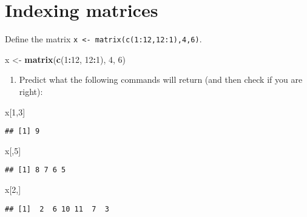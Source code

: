 \documentclass[]{article}
\newenvironment{Shaded}{\begin{snugshade}}{\end{snugshade}}
\newcommand{\KeywordTok}[1]{\textcolor[rgb]{0.13,0.29,0.53}{\textbf{#1}}}
\newcommand{\DecValTok}[1]{\textcolor[rgb]{0.00,0.00,0.81}{#1}}
\newcommand{\StringTok}[1]{\textcolor[rgb]{0.31,0.60,0.02}{#1}}
\newcommand{\OperatorTok}[1]{\textcolor[rgb]{0.81,0.36,0.00}{\textbf{#1}}}
\newcommand{\NormalTok}[1]{#1}
\providecommand{\tightlist}{%
  \setlength{\itemsep}{0pt}\setlength{\parskip}{0pt}}
\begin{document}
\section{Indexing matrices}\label{indexing-matrices}

Define the matrix \texttt{x\ \textless{}-\ matrix(c(1:12,12:1),4,6)}.

\begin{Shaded}
\begin{Highlighting}[]
\NormalTok{x <-}\StringTok{ }\KeywordTok{matrix}\NormalTok{(}\KeywordTok{c}\NormalTok{(}\DecValTok{1}\OperatorTok{:}\DecValTok{12}\NormalTok{, }\DecValTok{12}\OperatorTok{:}\DecValTok{1}\NormalTok{), }\DecValTok{4}\NormalTok{, }\DecValTok{6}\NormalTok{)}
\end{Highlighting}
\end{Shaded}

\begin{enumerate}
\def\labelenumi{\arabic{enumi}.}
\tightlist
\item
  Predict what the following commands will return (and then check if you
  are right):
\end{enumerate}

\begin{Shaded}
\begin{Highlighting}[]
\NormalTok{x[}\DecValTok{1}\NormalTok{,}\DecValTok{3}\NormalTok{]}
\end{Highlighting}
\end{Shaded}

\begin{verbatim}
## [1] 9
\end{verbatim}

\begin{Shaded}
\begin{Highlighting}[]
\NormalTok{x[,}\DecValTok{5}\NormalTok{]}
\end{Highlighting}
\end{Shaded}

\begin{verbatim}
## [1] 8 7 6 5
\end{verbatim}

\begin{Shaded}
\begin{Highlighting}[]
\NormalTok{x[}\DecValTok{2}\NormalTok{,]}
\end{Highlighting}
\end{Shaded}

\begin{verbatim}
## [1]  2  6 10 11  7  3
\end{verbatim}
\end{document}
